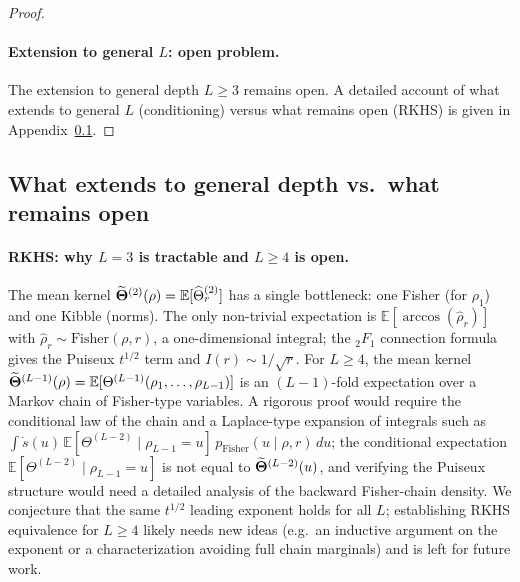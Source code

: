 \begin{proof}
\paragraph{Extension to general \( L \): open problem.}
The extension to general depth \( L \ge 3 \) remains open. A detailed account of what extends to general \(L\) (conditioning) versus what remains open (RKHS) is given in Appendix~\ref{appendix:what-extends-L}.
\end{proof}

\subsection{What extends to general depth vs.\ what remains open}\label{appendix:what-extends-L}

\paragraph{RKHS: why \(L=3\) is tractable and \(L\ge 4\) is open.}
The mean kernel \(\widetilde{\boldsymbol{\Theta}}^{(2)}(\rho)=\mathbb{E}[\widehat{\Theta}^{(2)}_r]\) has a single bottleneck: one Fisher (for \(\rho_1\)) and one Kibble (norms). The only non-trivial expectation is \(\mathbb{E}[\arccos(\hat{\rho}_r)]\) with \(\hat{\rho}_r\sim\mathrm{Fisher}(\rho,r)\), a one-dimensional integral; the \({}_2F_1\) connection formula gives the Puiseux \(t^{1/2}\) term and \(I(r)\sim 1/\sqrt{r}\). For \(L\ge 4\), the mean kernel \(\widetilde{\boldsymbol{\Theta}}^{(L-1)}(\rho)=\mathbb{E}[\Theta^{(L-1)}(\rho_1,\ldots,\rho_{L-1})]\) is an \((L-1)\)-fold expectation over a Markov chain of Fisher-type variables. A rigorous proof would require the conditional law of the chain and a Laplace-type expansion of integrals such as \(\int \dot{s}(u)\,\mathbb{E}[\Theta^{(L-2)}\mid\rho_{L-1}=u]\,p_{\mathrm{Fisher}}(u\mid\rho,r)\,du\); the conditional expectation \(\mathbb{E}[\Theta^{(L-2)}\mid\rho_{L-1}=u]\) is not equal to \(\widetilde{\boldsymbol{\Theta}}^{(L-2)}(u)\), and verifying the Puiseux structure would need a detailed analysis of the backward Fisher-chain density. We conjecture that the same \(t^{1/2}\) leading exponent holds for all \(L\); establishing RKHS equivalence for \(L\ge 4\) likely needs new ideas (e.g.\ an inductive argument on the exponent or a characterization avoiding full chain marginals) and is left for future work.


